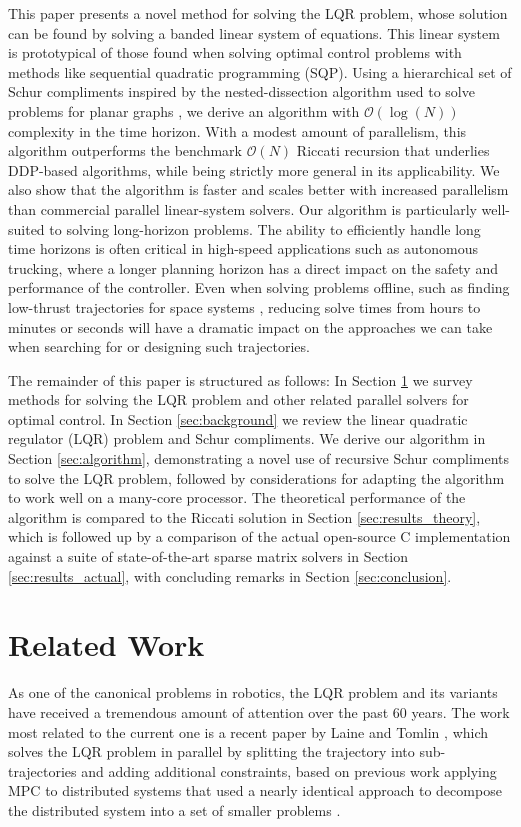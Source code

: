 \documentclass[../root.tex]{subfiles}
\newcommand{\0}{{\transparent{0} \resizebox{\mycellheight}{\mycellheight}{0}}}
\begin{document}
This paper presents a novel method for solving the LQR problem, whose solution can be found 
by solving a banded linear system of equations. This linear system is prototypical of those 
found when solving optimal control problems with methods like sequential quadratic
programming (SQP). Using a hierarchical set of Schur compliments inspired by the
nested-dissection algorithm used to solve problems for planar graphs
\cite{george_Nested_1973,khaira_Nested_}, we derive an algorithm with $\mathcal{O}(\log(N))$
complexity in the time horizon. With a modest amount of parallelism, this algorithm
outperforms the benchmark $\mathcal{O}(N)$ Riccati recursion that underlies DDP-based
algorithms, while being strictly more general in its applicability. We also show that the
algorithm is faster and scales better with increased parallelism than commercial parallel
linear-system solvers. Our algorithm is particularly well-suited to solving long-horizon
problems. The ability to efficiently handle long time horizons is often critical in
high-speed applications such as autonomous trucking, where a longer planning horizon has a
direct impact on the safety and performance of the controller. Even when solving problems
offline, such as finding low-thrust trajectories for space systems
\cite{tracy_LowThrust_2021}, reducing solve times from hours to minutes or seconds will have a
dramatic impact on the approaches we can take when searching for or designing such
trajectories. 

The remainder of this paper is structured as
follows: In Section \ref{sec:related_work} we survey methods for solving the LQR problem and
other related parallel solvers for optimal control. In Section \ref{sec:background} we 
review the linear quadratic regulator (LQR) problem and Schur compliments. We derive our 
algorithm in Section \ref{sec:algorithm}, demonstrating a novel use of recursive
Schur compliments to solve the LQR problem, followed by considerations for adapting the 
algorithm to work well on a many-core processor. The theoretical performance of the 
algorithm is compared to the Riccati solution in Section \ref{sec:results_theory}, which is 
followed up by a comparison of the actual open-source C implementation against
a suite of state-of-the-art sparse matrix solvers in Section \ref{sec:results_actual}, with 
concluding remarks in Section \ref{sec:conclusion}.

\section{Related Work} \label{sec:related_work}
As one of the canonical problems in robotics, the LQR problem and its variants have received
a tremendous amount of attention over the past 60 years. The work most related to the
current one is a recent paper by Laine and Tomlin \cite{laine_Parallelizing_2019}, which
solves the LQR problem in parallel by splitting the trajectory into sub-trajectories and
adding additional constraints, based on previous work applying MPC to distributed systems
that used a nearly identical approach to decompose the distributed system into a set of
smaller problems \cite{soudbakhsh_Parallelized_2013}.
\end{document}
